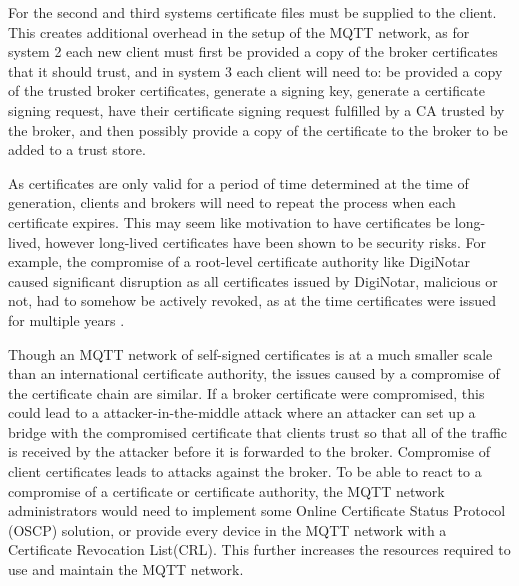 \documentclass[12pt]{article}
\begin{document}
For the second and third systems certificate files must be supplied to the client. This creates additional overhead in the setup of the MQTT network, as for system 2 each new client must first be provided a copy of the broker certificates that it should trust, and in system 3 each client will need to: be provided a copy of the trusted broker certificates, generate a signing key, generate a certificate signing request, have their certificate signing request fulfilled by a CA trusted by the broker, and then possibly provide a copy of the certificate to the broker to be added to a trust store.\par
As certificates are only valid for a period of time determined at the time of generation, clients and brokers will need to repeat the process when each certificate expires. This may seem like motivation to have certificates be long-lived, however long-lived certificates have been shown to be security risks. For example, the compromise of a root-level certificate authority like DigiNotar caused significant disruption as all certificates issued by DigiNotar, malicious or not, had to somehow be actively revoked, as at the time certificates were issued for multiple years \cite{diginotar}.\par
Though an MQTT network of self-signed certificates is at a much smaller scale than an international certificate authority, the issues caused by a compromise of the certificate chain are similar. If a broker certificate were compromised, this could lead to a attacker-in-the-middle attack where an attacker can set up a bridge with the compromised certificate that clients trust so that all of the traffic is received by the attacker before it is forwarded to the broker. Compromise of client certificates leads to attacks against the broker. To be able to react to a compromise of a certificate or certificate authority, the MQTT network administrators would need to implement some Online Certificate Status Protocol (OSCP) solution, or provide every device in the MQTT network with a Certificate Revocation List(CRL). This further increases the resources required to use and maintain the MQTT network. 
\end{document}
